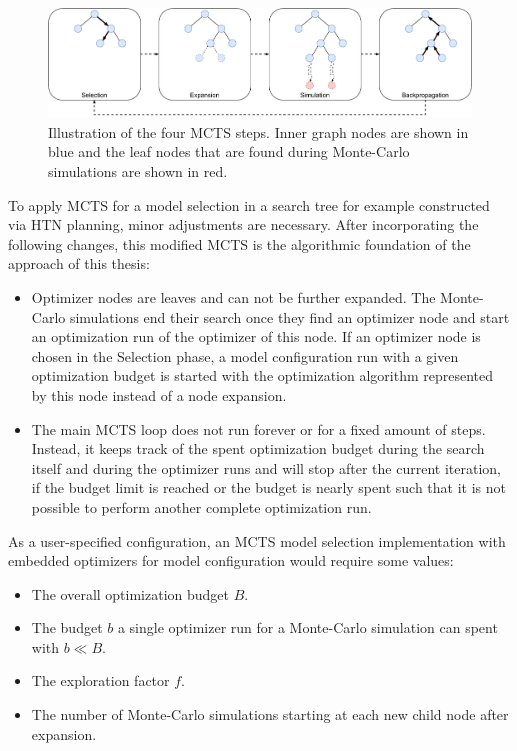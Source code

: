 \begin{figure}[ht!]
    \centering
    \includegraphics[width=\textwidth]{gfx/Figures/Approach/MCTS.pdf}
    \caption[Illustration of the four MCTS steps.]{Illustration of the four MCTS steps. Inner graph nodes are shown in blue and the leaf nodes that are found during Monte-Carlo simulations are shown in red.}
    \label{fig:approach:mcts}
\end{figure}

To apply MCTS for a model selection in a search tree for example constructed via HTN planning, minor adjustments are necessary.
After incorporating the following changes, this modified MCTS is the algorithmic foundation of the approach of this thesis:
\begin{itemize}
    \item Optimizer nodes are leaves and can not be further expanded. The Monte-Carlo simulations end their search once they find an optimizer node and start an optimization run of the optimizer of this node. If an optimizer node is chosen in the Selection phase, a model configuration run with a given optimization budget is started with the optimization algorithm represented by this node instead of a node expansion.
    \item The main MCTS loop does not run forever or for a fixed amount of steps. Instead, it keeps track of the spent optimization budget during the search itself and during the optimizer runs and will stop after the current iteration, if the budget limit is reached or the budget is nearly spent such that it is not possible to perform another complete optimization run.
\end{itemize}
As a user-specified configuration, an MCTS model selection implementation with embedded optimizers for model configuration would require some values:
\begin{itemize}
    \item The overall optimization budget $B$.
    \item The budget $b$ a single optimizer run for a Monte-Carlo simulation can spent with $b \ll B$.
    \item The exploration factor $f$.
    \item The number of Monte-Carlo simulations starting at each new child node after expansion.
\end{itemize}

